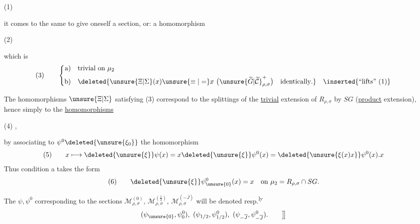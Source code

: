 \noindent (1)\quad
{}


it comes to the same to give oneself a section,
or: a homomorphism

\noindent (2)\quad
{}

which is 
\[
\text{(3)}\qquad
\left\{\begin{aligned}
\text{a)}\quad &\text{trivial on }\mu_2\\
\text{b)}\quad &\deleted{\unsure{\Xi|\Sigma}(x)\unsure{\equiv|=}x\ \bigl(\unsure{\widetilde G|\widetilde{\mathcal C}}^+_{\rho,\sigma}\bigr)\quad\text{identically}.}\quad\inserted{\text{``lifts'' (1)}}
\end{aligned}\right.
\]

The homomorphisms $\unsure{\Xi|\Sigma}$ satisfying (3) correspond
to the splittings of the \uline{trivial} extension of
$R_{\rho,\sigma}$ by $SG$ (\uline{product} extension), hence
simply to the \uline{homomorphisms}

\noindent (4)\quad
{},



by associating to $\psi^0\deleted{\unsure{\xi_0}}$ the homomorphism
\[
(5)\qquad x\longmapsto \deleted{\unsure{\xi}}\psi(x)
=x\deleted{\unsure{\xi}}\psi^0(x)
=\deleted{\unsure{\xi(x)x}}\psi^0(x).x
\]
Thus condition a takes the form
\[
(6)\qquad \deleted{\unsure{\xi}}\psi^0_{\unsure{0}}(x)=x
\quad\text{on }\mu_2=R_{\rho,\sigma}\cap SG.
\]

\margin{\deleted{\unsure{$\rho$}}}
The $\psi,\psi^0$ corresponding to the  sections
$\mathcal M_{\rho,\sigma}^{(0)}$, $\mathcal M_{\rho,\sigma}^{(\frac12)}$,
$\mathcal M_{\rho,\sigma}^{(-\overline J)}$ will be denoted resp.\textsuperscript{ly}
\[
(\psi_{\unsure{0}},\psi^0_0),\ (\psi_{1/2},\psi^0_{1/2}),\
(\psi_{-\overline J},\psi^0_{-\overline J}).\qquad\big]\!\big]
\]

